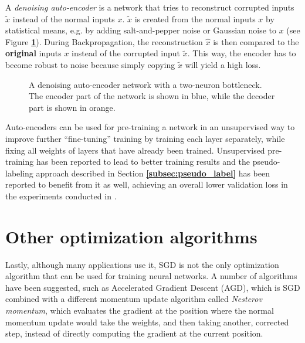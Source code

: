 A \textit{denoising auto-encoder} is a network that tries to reconstruct corrupted inputs $\widetilde{x}$ instead of the normal inputs $x$. $\widetilde{x}$ is created from the normal inputs $x$ by statistical means, e.g. by adding salt-and-pepper noise or Gaussian noise to $x$ (see Figure \textbf{\ref{fig:auto_encoder}}). During Backpropagation, the reconstruction $\hat{x}$ is then compared to the \textbf{original} inputs $x$ instead of the corrupted input $\widetilde{x}$. This way, the encoder has to become robust to noise because simply copying $\widetilde{x}$ will yield a high loss. \cite{autoencoder, denoising_autoencoder}\\

\begin {figure}[!htb]
	\begin{center}
		\scalebox{0.70}{}
	\end{center}

		\caption[A denoising auto-encoder.]{A denoising auto-encoder network with a two-neuron bottleneck. The encoder part of the network is shown in blue, while the decoder part is shown in orange.}
		\label{fig:auto_encoder}
\end {figure}

Auto-encoders can be used for pre-training a network in an unsupervised way to improve further ``fine-tuning'' training by training each layer separately, while fixing all weights of layers that have already been trained. Unsupervised pre-training has been reported to lead to better training results \cite{pretraining} and the pseudo-labeling approach described in Section \textbf{\ref{subsec:pseudo_label}} has been reported to benefit from it as well, achieving an overall lower validation loss in the experiments conducted in \cite{pseudo_label}.


	\section{Other optimization algorithms}

Lastly, although many applications use it, SGD is not the only optimization algorithm that can be used for training neural networks. A number of algorithms have been suggested, such as Accelerated Gradient Descent (AGD), which is SGD combined with a different momentum update algorithm called \textit{Nesterov momentum}, which evaluates the gradient at the position where the normal momentum update would take the weights, and then taking another, corrected step, instead of directly computing the gradient at the current position. \cite{nesterov}

